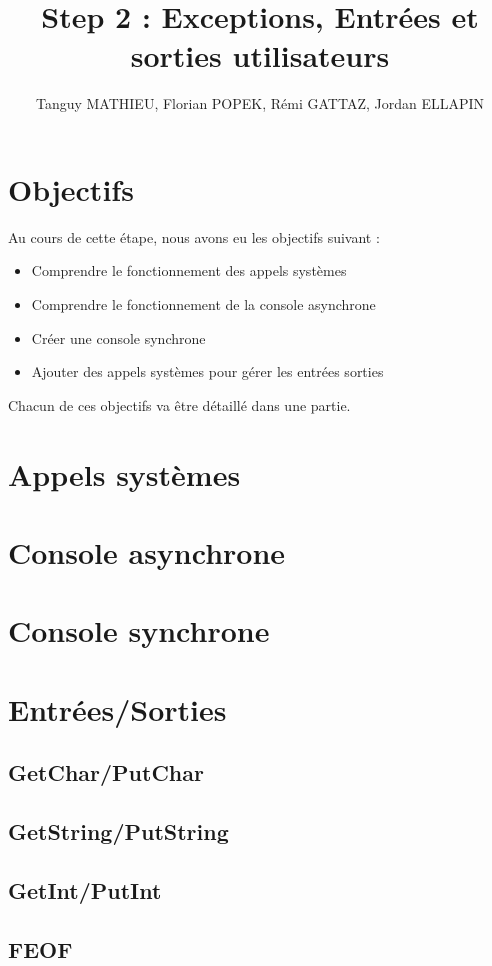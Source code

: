 \documentclass[a4paper,10pt]{article}
\title{Step 2 : Exceptions, Entrées et sorties utilisateurs}
\author{Tanguy MATHIEU, Florian POPEK, Rémi GATTAZ, Jordan ELLAPIN}
\begin{document}
    \maketitle
    \tableofcontents
    \newpage

    \section{Objectifs}
    Au cours de cette étape, nous avons eu les objectifs suivant :
    \begin{itemize}
        \item Comprendre le fonctionnement des appels systèmes
        \item Comprendre le fonctionnement de la console asynchrone
        \item Créer une console synchrone
        \item Ajouter des appels systèmes pour gérer les entrées sorties
    \end{itemize}

    Chacun de ces objectifs va être détaillé dans une partie.


    \section{Appels systèmes}

    \section{Console asynchrone}

    \section{Console synchrone}

    \section{Entrées/Sorties}

    \subsection{GetChar/PutChar}
    \subsection{GetString/PutString}
    \subsection{GetInt/PutInt}


    \subsection{FEOF}
\end{document}
